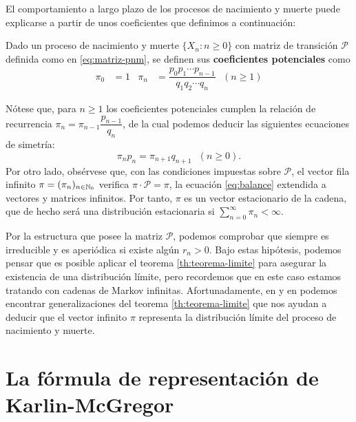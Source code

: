     El comportamiento a largo plazo de los procesos de nacimiento y muerte puede explicarse a partir de unos coeficientes que definimos a continuación:

    \begin{definicion}
        \label{def:coeficientes-potenciales}
        Dado un proceso de nacimiento y muerte $\{X_n:n\geq 0\}$ con matriz de transición $\mathcal P$ definida como en \eqref{eq:matriz-pnm}, se definen sus \textbf{coeficientes potenciales} como
        \begin{align}
            \label{eq:coeficientes-potenciales}
            \pi_0&= 1 & \pi_n &= \dfrac{p_0 p_1 \cdots p_{n-1}}{q_1 q_2 \cdots q_n} \ \ \ (n\geq 1)
        \end{align}
    \end{definicion}
    Nótese que, para $n\geq 1$ los coeficientes potenciales cumplen la relación de recurrencia $\pi_n = \pi_{n-1} \dfrac{p_{n-1}}{q_n}$, de la cual podemos deducir las siguientes ecuaciones de simetría:
    \begin{equation}
        \label{eq:ecs-simetria}
        \pi_n p_n = \pi_{n+1}q_{n+1} \ \ \ (n\geq 0).
    \end{equation} 
    Por otro lado, obsérvese que, con las condiciones impuestas sobre $\mathcal P$, el vector fila infinito $\pi = (\pi_n)_{n\in\mathbb{N}_0}$ verifica $\pi \cdot \mathcal P =\pi$, la ecuación \eqref{eq:balance} extendida a vectores y matrices infinitos. Por tanto, $\pi$ es un vector estacionario de la cadena, que de hecho será una distribución estacionaria si $\sum_{n=0}^\infty \pi_n < \infty$.

    Por la estructura que posee la matriz $\mathcal P$, podemos comprobar que siempre es irreducible y es aperiódica si existe algún $r_n>0$. Bajo estas hipótesis, podemos pensar que es posible aplicar el teorema \ref{th:teorema-limite} para asegurar la existencia de una distribución límite, pero recordemos que en este caso estamos tratando con cadenas de Markov infinitas. Afortunadamente, en \cite[Theorem 5.5]{Seneta} y en \cite[Theorem 2.3]{Manuel} podemos encontrar generalizaciones del teorema \ref{th:teorema-limite} que nos ayudan a deducir que el vector infinito $\pi$ representa la distribución límite del proceso de nacimiento y muerte.

    
    \section{La fórmula de representación de Karlin-McGregor}
    \label{section:formula-representacion}

